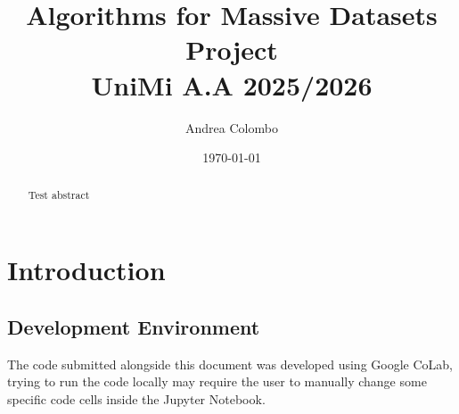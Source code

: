 \documentclass[11pt]{article}
\title{Algorithms for Massive Datasets Project \\ UniMi A.A 2025/2026}
\author{Andrea Colombo}
\date{\today}
\begin{document}
\maketitle
\begin{abstract}
Test abstract
\end{abstract}
\tableofcontents
\newpage
\section{Introduction}
\subsection{Development Environment}
The code submitted alongside this document was developed using Google CoLab,
trying to run the code locally may require the user to manually change some
specific code cells inside the Jupyter Notebook.
\end{document}
